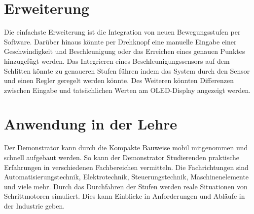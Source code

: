 \section{Erweiterung}

Die einfachste Erweiterung ist die Integration von neuen Bewegungsstufen per Software. Darüber hinaus könnte per Drehknopf eine manuelle Eingabe einer Geschwindigkeit und Beschleunigung oder das Erreichen eines genauen Punktes hinzugefügt werden. Das Integrieren eines Beschleunigungssensors auf dem Schlitten könnte zu genaueren Stufen führen indem das System durch den Sensor und einen Regler geregelt werden könnte. Des Weiteren könnten Differenzen zwischen Eingabe und tatsächlichen Werten am OLED-Display angezeigt werden. 

\section{Anwendung in der Lehre}

Der Demonstrator kann durch die Kompakte Bauweise mobil mitgenommen und schnell aufgebaut werden. So kann der Demonstrator Studierenden praktische Erfahrungen in verschiedenen Fachbereichen vermitteln. Die Fachrichtungen sind Automatisierungstechnik, Elektrotechnik, Steuerungstechnik, Maschinenelemente und viele mehr. Durch das Durchfahren der Stufen werden reale Situationen von Schrittmotoren simuliert. Dies kann Einblicke in Anforderungen und Abläufe in der Industrie geben. 

